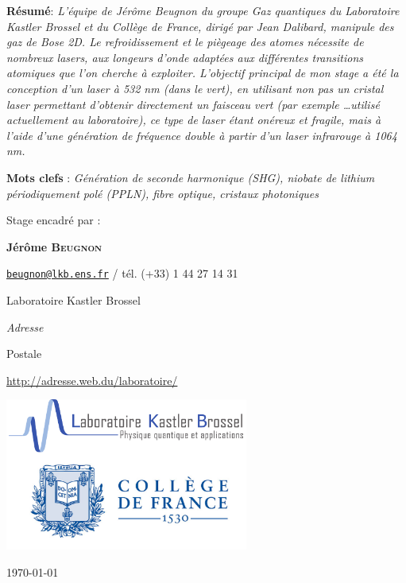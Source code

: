 \documentclass[11pt,a4paper]{article}
\begin{document}
\begin{@empty}
\begin{center}
\parbox{15cm}{\small
	\textbf{R\'esum\'e}: \it L'équipe de Jérôme Beugnon du groupe Gaz quantiques du Laboratoire Kastler Brossel et du Collège de France, dirigé par Jean Dalibard, manipule des gaz de Bose 2D. Le refroidissement et le piègeage des atomes nécessite de nombreux lasers, aux longeurs d'onde adaptées aux différentes transitions atomiques que l'on cherche à exploiter.
	L'objectif principal de mon stage a été la conception d'un laser à 532 nm (dans le vert), en utilisant non pas un cristal laser permettant d'obtenir directement un faisceau vert (par exemple \dots utilisé actuellement au laboratoire), ce type de laser étant onéreux et fragile, mais à l'aide d'une génération de fréquence double à partir d'un laser infrarouge à 1064 nm.
\vspace{0.5cm}
} 


\vspace{0.5cm}

\parbox{15cm}{
\textbf{Mots clefs} : \it Génération de seconde harmonique (SHG), niobate de lithium périodiquement polé (PPLN), fibre optique, cristaux photoniques}%

\vspace{0.5cm}

\parbox{15cm}{
Stage encadr\'e par :

{\bf Jérôme \textsc{Beugnon}}

\href{mailto:beugnon@lkb.ens.fr}{\tt beugnon@lkb.ens.fr} / t\'el. (+33) 1 44 27 14 31


Laboratoire Kastler Brossel

{\it Adresse

Postale}

\url{http://adresse.web.du/laboratoire/}
} 

\vspace{0.5cm}

\includegraphics[height=5cm]{./img/logos.png}

\end{center}

\vfill
\hfill \today

\end{@empty}
\end{document}
